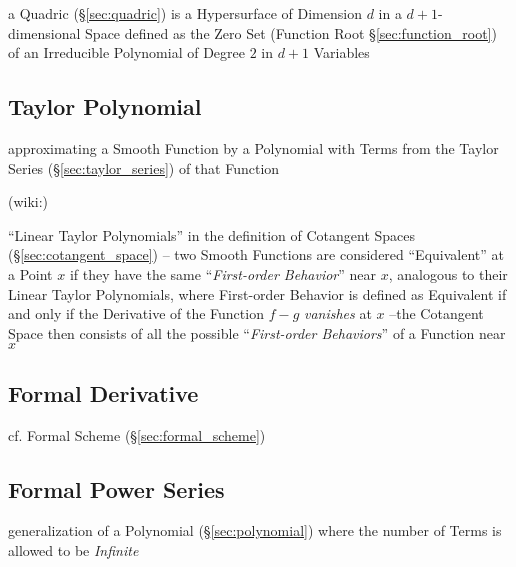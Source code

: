 \fist a Quadric (\S\ref{sec:quadric}) is a Hypersurface of Dimension $d$ in a
$d+1$-dimensional Space defined as the Zero Set (Function Root
\S\ref{sec:function_root}) of an Irreducible Polynomial of Degree $2$ in $d+1$
Variables



\subsection{Taylor Polynomial}\label{sec:taylor_polynomial}

approximating a Smooth Function by a Polynomial with Terms from the
Taylor Series (\S\ref{sec:taylor_series}) of that Function

(wiki:)

``Linear Taylor Polynomials'' in the definition of Cotangent Spaces
(\S\ref{sec:cotangent_space}) -- two Smooth Functions are considered
``Equivalent'' at a Point $x$ if they have the same ``\emph{First-order
  Behavior}'' near $x$, analogous to their Linear Taylor Polynomials,
where First-order Behavior is defined as Equivalent if and only if the
Derivative of the Function $f-g$ \emph{vanishes} at $x$ --the Cotangent Space
then consists of all the possible ``\emph{First-order Behaviors}'' of a
Function near $x$



\subsection{Formal Derivative}\label{sec:formal_derivative}


cf. Formal Scheme (\S\ref{sec:formal_scheme})



\subsection{Formal Power Series}\label{sec:formal_power_series}

generalization of a Polynomial (\S\ref{sec:polynomial}) where the number of
Terms is allowed to be \emph{Infinite}

